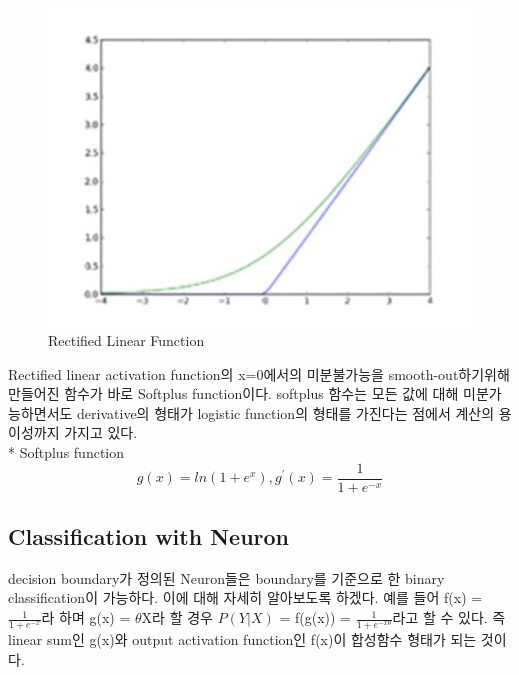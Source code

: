 \documentclass[draft=false]{oblivoir}
\begin{document}
\begin{figure}[ht] \centering 
\includegraphics[scale=0.4]{fig14_8.png} 
\caption{Rectified Linear Function}
\label{fig:14-8}
\end{figure}

Rectified linear activation function의 x=0에서의 미분불가능을 smooth-out하기위해 만들어진 함수가 바로 Softplus function이다. softplus 함수는 모든 값에 대해 미분가능하면서도 derivative의 형태가 logistic function의 형태를 가진다는 점에서 계산의 용이성까지 가지고 있다.  \\

* Softplus function
\begin{equation}
g(x) = ln(1+e^{x}),  g^{'}(x)=\frac{1}{1+e^{-x}}
\label{eq:14-2-8}
\end{equation}

\subsection{Classification with Neuron}
decision boundary가 정의된 Neuron들은 boundary를 기준으로 한 binary classification이 가능하다. 이에 대해 자세히 알아보도록 하겠다. 예를 들어 f(x) = $\frac{1}{1+e^{-x}}$라 하며 g(x) = $\theta$X라 할 경우 $P(Y|X)$ = f(g(x)) = $\frac{1}{1+e^{-x\theta}}$라고 할 수 있다. 즉 linear sum인 g(x)와 output activation function인 f(x)이 합성함수 형태가 되는 것이다. 
\end{document}
